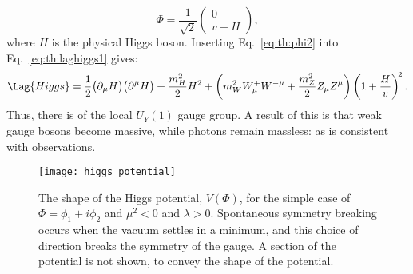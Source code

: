 \begin{equation}
  \Phi = \frac{1}{\sqrt{2}}
  \begin{pmatrix} 0 \\ v+H
  \end{pmatrix},
  \label{eq:th:phi2}
\end{equation}
where $H$ is the physical Higgs boson.
Inserting Eq.~\ref{eq:th:phi2} into Eq.~\ref{eq:th:laghiggs1} gives:
\begin{equation}
  \Lag{Higgs} =
  \frac{1}{2}\big(\partial_\mu H\big)\big(\partial^\mu H\big)
  +\frac{m_H^2}{2}H^2
  +\left(m_W^2W_\mu^+W^{-\mu} + \frac{m_Z^2}{2}Z_\mu Z^\mu\right)
  \left(1 + \frac{H}{v}\right)^{\!2}.
  \label{eq:th:laghiggs2}
\end{equation}
Thus, there is \SSB of the local $U_Y(1)$ gauge group.
A result of this is that weak gauge bosons become massive, while photons remain massless: as is
consistent with observations.

\begin{figure}
  \begin{center}
    \texttt{[image: higgs\_potential]}
    \caption[Shape of the Higgs potential]
    {
      The shape of the Higgs potential, $V(\Phi)$, for the simple case of $\Phi=\phi_1+i\phi_2$ and
      $\mu^2<0$ and $\lambda>0$.
      Spontaneous symmetry breaking occurs when the vacuum settles in a minimum, and this choice of
      direction breaks the symmetry of the gauge.
      A section of the potential is not shown, to convey the shape of the potential.
    }
    \label{fig:th:higgspot}
  \end{center}
\end{figure}


